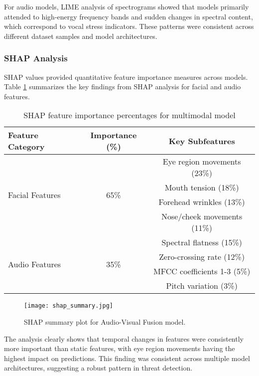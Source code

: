 \documentclass[conference,compsoc]{IEEEtran}
\begin{document}
For audio models, LIME analysis of spectrograms showed that models primarily attended to high-energy frequency bands and sudden changes in spectral content, which correspond to vocal stress indicators. These patterns were consistent across different dataset samples and model architectures.

\subsubsection{SHAP Analysis}
SHAP values provided quantitative feature importance measures across models. Table \ref{tab:shap_importance} summarizes the key findings from SHAP analysis for facial and audio features.

\begin{table}[!t]
\caption{SHAP feature importance percentages for multimodal model}
\label{tab:shap_importance}
\centering
\renewcommand{\arraystretch}{1.2}
\begin{tabular}{lcc}
\toprule
\textbf{Feature Category} & \textbf{Importance (\%)} & \textbf{Key Subfeatures} \\
\midrule
\multirow{4}{*}{Facial Features} & \multirow{4}{*}{65\%} & Eye region movements (23\%) \\
 & & Mouth tension (18\%) \\
 & & Forehead wrinkles (13\%) \\
 & & Nose/cheek movements (11\%) \\
\midrule
\multirow{4}{*}{Audio Features} & \multirow{4}{*}{35\%} & Spectral flatness (15\%) \\
 & & Zero-crossing rate (12\%) \\
 & & MFCC coefficients 1-3 (5\%) \\
 & & Pitch variation (3\%) \\
\bottomrule
\end{tabular}
\end{table}

\begin{figure}[!t]
\centering
\texttt{[image: shap\_summary.jpg]}
\caption{SHAP summary plot for Audio-Visual Fusion model.}
\label{fig:shap_summary}
\end{figure}
\FloatBarrier

The analysis clearly shows that temporal changes in features were consistently more important than static features, with eye region movements having the highest impact on predictions. This finding was consistent across multiple model architectures, suggesting a robust pattern in threat detection.
\end{document}
